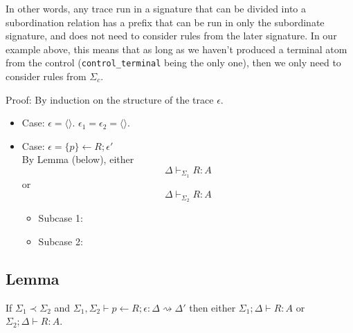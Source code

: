 \documentclass{article}
\newcommand{\subord}{\prec}
\newcommand{\eps}{\epsilon}
\newcommand{\stepsto}{\rightsquigarrow}
\newcommand{\nileps}{\langle\rangle}
\begin{document}
In other words, any trace run in a signature that can be divided into a
subordination relation has a prefix that can be run in only the subordinate
signature, and does not need to consider rules from the later signature. In
our example above, this means that as long as we haven't produced a
terminal atom from the control (\verb|control_terminal| being the only
one), then we only need to consider rules from $\Sigma_c$.

Proof: By induction on the structure of the trace $\eps$.

\begin{itemize}
\item Case: $\eps = \nileps$. $\eps_1 = \eps_2 = \nileps$. \checkmark
\item Case: $\eps = \{p\}\gets R; \eps'$\\
  By Lemma (below), either 
  \[ \Delta \vdash_{\Sigma_1} R : A \]
  or
  \[ \Delta \vdash_{\Sigma_2} R : A \]
  \begin{itemize}
  \item Subcase 1:
  \item Subcase 2:
  \end{itemize}
\end{itemize}

\subsection{Lemma}

If $\Sigma_1 \subord \Sigma_2$ and $\Sigma_1, \Sigma_2 \vdash p \gets
R;\eps :
\Delta \stepsto \Delta'$
then either
$\Sigma_1; \Delta \vdash R : A$
or
$\Sigma_2; \Delta \vdash R : A$.

% 
% 
\end{document}
